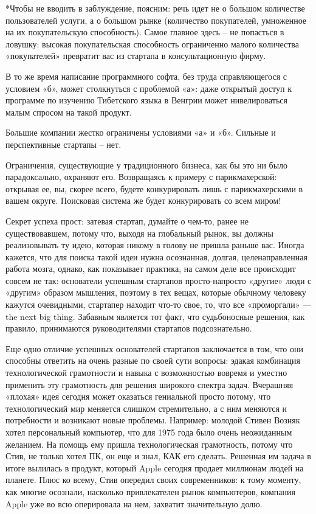 \documentclass[ebook,12pt,oneside,openany]{memoir}
\begin{document}
*Чтобы не вводить в заблуждение, поясним: речь идет не о большом
количестве пользователей услуги, а о большом рынке (количество
покупателей, умноженное на их покупательскую способность). Самое
главное здесь – не попасться в ловушку: высокая покупательская
способность ограниченно малого количества «покупателей» превратит вас
из стартапа в консультационную фирму.

В то же время написание программного софта, без труда справляющегося с
условием «б», может столкнуться с проблемой «а»: даже открытый доступ
к программе по изучению Тибетского языка в Венгрии может
нивелироваться малым спросом на такой продукт.

Большие компании жестко ограничены условиями «а» и «б». Сильные и
перспективные стартапы – нет.

Ограничения, существующие у традиционного бизнеса, как бы это ни было
парадоксально, охраняют его. Возвращаясь к примеру с парикмахерской:
открывая ее, вы, скорее всего, будете конкурировать лишь с
парикмахерскими в вашем округе. Поисковая система же будет
конкурировать со всем миром!

Секрет успеха прост: затевая стартап, думайте о чем-то, ранее не
существовавшем, потому что, выходя на глобальный рынок, вы должны
реализовывать ту идею, которая никому в голову не пришла раньше вас.
Иногда кажется, что для поиска такой идеи нужна осознанная, долгая,
целенаправленная работа мозга, однако, как показывает практика, на
самом деле все происходит совсем не так: основатели успешным стартапов
просто-напросто «другие» люди с «другим» образом мышления, поэтому в
тех вещах, которые обычному человеку кажутся очевидными, стартапер
находит что-то свое, то, что все «проморгали» — the next big thing.
Забавным является тот факт, что судьбоносные решения, как правило,
принимаются руководителями стартапов подсознательно.

Еще одно отличие успешных основателей стартапов заключается в том, что
они способны ответить на очень разные по своей сути вопросы: эдакая
комбинация технологической грамотности и навыка с возможностью вовремя
и уместно применить эту грамотность для решения широкого спектра
задач. Вчерашняя «плохая» идея сегодня может оказаться гениальной
просто потому, что технологический мир меняется слишком стремительно,
а с ним меняются и потребности и возникают новые проблемы. Например:
молодой Стивен Возняк хотел персональный компьютер, что для 1975 года
было очень неожиданным желанием. На помощь ему пришла технологическая
грамотность, потому что Стив, не только хотел ПК, он еще и знал, КАК
его сделать. Решенная им задача в итоге вылилась в продукт, который
Apple сегодня продает миллионам людей на планете. Плюс ко всему, Стив
опередил своих современников: к тому моменту, как многие осознали,
насколько привлекателен рынок компьютеров, компания Apple уже во всю
оперировала на нем, захватит значительную долю.
\end{document}
